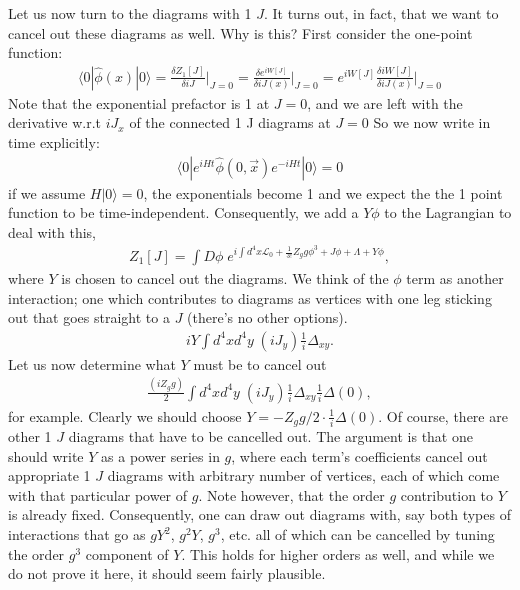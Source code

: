 \documentclass{../mathnotes}
\begin{document}
Let us now turn to the diagrams with 1 $J$. It turns out, in fact, that we want to cancel out these diagrams as well. Why is this?
First consider the one-point function:
\begin{align*}
    \langle 0 | \hat\phi(x) | 0 \rangle = \frac{\delta Z_1[J]}{\delta iJ}\bigg|_{J=0}=\frac{\delta e^{iW[J]}}{\delta iJ(x)}\bigg|_{J=0}
    =e^{iW[J]}\frac{\delta iW[J]}{\delta iJ(x)}\bigg|_{J=0}
\end{align*}
Note that the exponential prefactor is 1 at $J=0$, and we are left with the derivative w.r.t $iJ_x$ of the connected 1 J diagrams at $J=0$
So we now write in time explicitly:
\begin{align*}
    \langle 0|e^{iHt}\hat\phi(0,\vec{x})e^{-iHt}|0\rangle=0
\end{align*}
if we assume $H|0\rangle =0$, the exponentials become 1 and we expect the the 1 point function to be time-independent. 
Consequently, we add a $Y\phi$ to the Lagrangian to deal with this,
\begin{align*}
    Z_1[J]=\int D\phi\; e^{i\int d^4x \mathcal{L}_0+\frac{1}{3!}Z_g g\phi^3+J\phi+\Lambda+Y\phi},
\end{align*}
where $Y$ is chosen to cancel out the diagrams. We think of the $\phi$ term as another interaction; one which contributes to diagrams
as vertices with one leg sticking out that goes straight to a $J$ (there's no other options). 
\begin{align*}
    iY\int d^4x d^4y\;(iJ_y)\frac{1}{i}\Delta_{xy}.
\end{align*}
Let us now determine what $Y$ must be to cancel out
\begin{align*}
    \frac{(iZ_gg)}{2}\int d^4xd^4y\;(iJ_y)\frac{1}{i}\Delta_{xy}\frac{1}{i}\Delta(0),
\end{align*}
for example. Clearly we should choose $Y=-Z_gg/2\cdot \frac{1}{i}\Delta(0)$. Of course, there are other 1 $J$ diagrams that
have to be cancelled out. The argument is that one should write $Y$ as a power series in $g$, where each term's coefficients cancel out
appropriate 1 $J$ diagrams with arbitrary number of vertices, each of which come with that particular power of $g$. Note however,
that the order $g$ contribution to $Y$ is already fixed. Consequently, one can draw out diagrams with, say both types of interactions
that go as $gY^2$, $g^2Y$, $g^3$, etc. all of which can be cancelled by tuning the order $g^3$ component of $Y$. This holds for higher orders
as well, and while we do not prove it here, it should seem fairly plausible.
\end{document}
